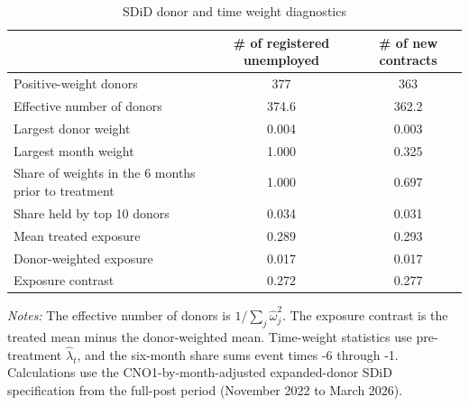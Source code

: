 \begin{table}[!htbp]
\centering
\caption{SDiD donor and time weight diagnostics}
\label{tab:v1_sdid_weight_diagnostics}
\begin{threeparttable}
\small
\begin{tabular}{lcc}
\toprule
& \# of registered unemployed & \# of new contracts \\
\midrule
Positive-weight donors & 377 & 363 \\
Effective number of donors & 374.6 & 362.2 \\
Largest donor weight & 0.004 & 0.003 \\
Largest month weight & 1.000 & 0.325 \\
Share of weights in the 6 months prior to treatment & 1.000 & 0.697 \\
Share held by top 10 donors & 0.034 & 0.031 \\
Mean treated exposure & 0.289 & 0.293 \\
Donor-weighted exposure & 0.017 & 0.017 \\
Exposure contrast & 0.272 & 0.277 \\
\bottomrule
\end{tabular}
\begin{tablenotes}[flushleft]
\footnotesize
\item \emph{Notes:} The effective number of donors is \(1/\sum_j\widehat{\omega}_j^2\). The exposure contrast is the treated mean minus the donor-weighted mean. Time-weight statistics use pre-treatment \(\widehat{\lambda}_t\), and the six-month share sums event times -6 through -1. Calculations use the CNO1-by-month-adjusted expanded-donor SDiD specification from the full-post period (November 2022 to March 2026).
\end{tablenotes}
\end{threeparttable}
\end{table}

